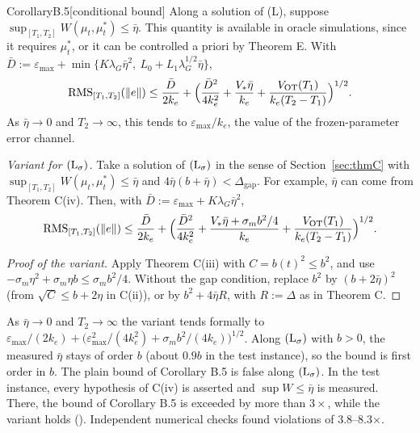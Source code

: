 \begin{thm}{Corollary}{B.5}[conditional bound]
Along a solution of (L), suppose $\sup_{[T_1,T_2]}W(\mu_t,\mu^*_t)\le\bar\eta$. This quantity is available in oracle
simulations, since it requires $\mu^*_t$, or it can be controlled a priori by Theorem E. With
$\bar D:=\varepsilon_{\max}+\min\{K\lambda_G\bar\eta^2,\ L_0+L_1\lambda_G^{1/2}\bar\eta\}$,
\begin{equation}\label{eq:thmB:B5}
  \operatorname{RMS}_{[T_1,T_2]}(\lVert e\rVert)\le\frac{\bar D}{2k_e}
  +\Bigl(\frac{\bar D^2}{4k_e^2}+\frac{V_*\bar\eta}{k_e}+\frac{V_{\mathrm{OT}}(T_1)}{k_e(T_2-T_1)}\Bigr)^{1/2}.
\end{equation}
As $\bar\eta\to0$ and $T_2\to\infty$, this tends to $\varepsilon_{\max}/k_e$, the value of the frozen-parameter error
channel.

\emph{Variant for $(\mathrm{L}_\sigma)$.} Take a solution of $(\mathrm{L}_\sigma)$ in the sense of Section~\ref{sec:thmC} with
$\sup_{[T_1,T_2]}W(\mu_t,\mu^*_t)\le\bar\eta$ and $4\bar\eta(b+\bar\eta)<\Delta_{\mathrm{gap}}$. For example,
$\bar\eta$ can come from Theorem C(iv). Then, with $\bar D:=\varepsilon_{\max}+K\lambda_G\bar\eta^2$,
\begin{equation}\label{eq:thmB:B5-variant}
  \operatorname{RMS}_{[T_1,T_2]}(\lVert e\rVert)\le\frac{\bar D}{2k_e}
  +\Bigl(\frac{\bar D^2}{4k_e^2}+\frac{V_*\bar\eta+\sigma_mb^2/4}{k_e}+\frac{V_{\mathrm{OT}}(T_1)}{k_e(T_2-T_1)}\Bigr)^{1/2}.
\end{equation}
\end{thm}

\begin{proof}[Proof of the variant]
Apply Theorem C(iii) with $C=b(t)^2\le b^2$, and use $-\sigma_m\eta^2+\sigma_m\eta b\le\sigma_mb^2/4$. Without the gap
condition, replace $b^2$ by $(b+2\bar\eta)^2$ (from $\sqrt C\le b+2\eta$ in C(ii)), or by $b^2+4\bar\eta R$, with $R:=\Delta$ as in Theorem C.
\end{proof}

As $\bar\eta\to0$ and $T_2\to\infty$ the variant tends formally to
$\varepsilon_{\max}/(2k_e)+\bigl(\varepsilon_{\max}^2/(4k_e^2)+\sigma_mb^2/(4k_e)\bigr)^{1/2}$. Along $(\mathrm{L}_\sigma)$ with
$b>0$, the measured $\bar\eta$ stays of order $b$ (about $0.9b$ in the test instance), so the bound is first order in
$b$. The plain bound of Corollary B.5 is false along $(\mathrm{L}_\sigma)$. In the test instance, every hypothesis of C(iv) is
asserted and $\sup W\le\bar\eta$ is measured. There, the bound of Corollary B.5 is exceeded by more than $3\times$,
while the variant holds
(). Independent
numerical checks found violations of 3.8--8.3$\times$.

